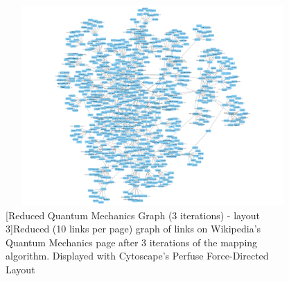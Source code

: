 \documentclass[man, 12pt, floatsintext, donotrepeattitle]{apa6}
\begin{document}
\begin{figure}[h]
  \centering
    \includegraphics[width=6in, height=3in]{Resources/10max/3iterations/QuantumMechanics_v_717_e_1009_c.png}
  [Reduced Quantum Mechanics Graph (3 iterations) - layout 3]{Reduced (10 links per page) graph of links on Wikipedia's Quantum Mechanics page after 3
  iterations of the mapping algorithm.  Displayed with Cytoscape's Perfuse Force-Directed Layout
    \label{figQuantumMechanics_v_717_e_1009_c}}
\end{figure}
\end{document}
